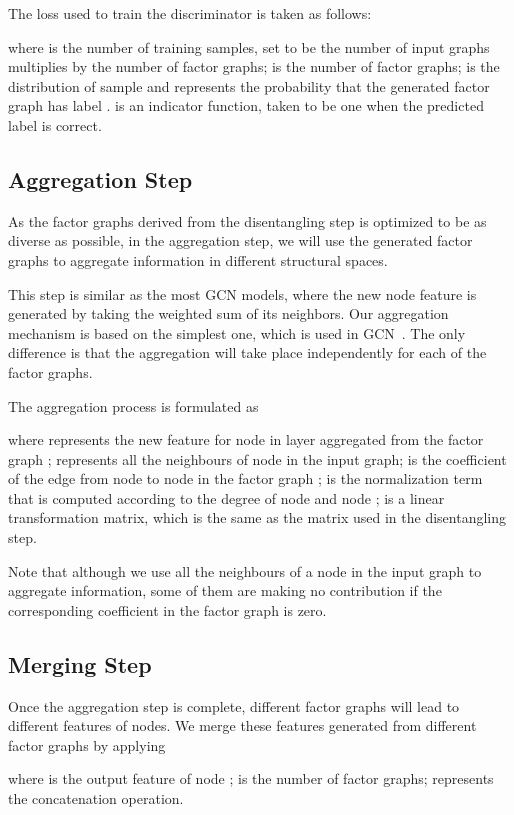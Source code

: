 \documentclass{article}
\begin{document}
The loss used to train the discriminator 
is taken as follows:
\begin{small}

\end{small}\noindent
where  is the number of training samples, 
set to be the number of input graphs 
multiplies by the number of factor graphs; 
 is the number of factor
graphs;  is the distribution
of sample  and  represents the
probability that the generated factor graph has label . 
 is an indicator function, taken to be one
when the predicted label is correct.

\subsection{{Aggregation Step}}
As the factor graphs derived from the disentangling step
is optimized to be as diverse as possible,
in the aggregation step, we will use the generated factor graphs
to aggregate information in different structural spaces.

This step is similar as the most GCN models, where
the new node feature is generated by taking the weighted sum of its
neighbors. Our aggregation mechanism is based on
the simplest one, which is used in GCN~\citep{kipf2017semi}. 
The only difference is that the aggregation will take place independently
for each of the factor graphs. 

The aggregation process is formulated as
\begin{small}

\end{small}\noindent
where  represents the new feature for node
 in  layer aggregated 
{from} the factor graph ;  represents all
the neighbours of node  in the input graph;
 is the coefficient of the edge from node  to
node  in the factor graph ;  is the
normalization term that is computed according to
the degree of node  and node ; 
 is a linear transformation matrix, 
which is the same as the matrix used in the disentangling step.

Note that although we use all the neighbours of a node
in the input graph to aggregate information, 
{some of them are making no contribution if the corresponding
coefficient in the factor graph is zero.}

\subsection{{Merging Step}}
Once the aggregation step is complete,
different factor graphs will lead to 
different features of nodes. 
We merge these  features generated from 
different factor graphs by applying
\begin{small}

\end{small}\noindent
where  is the output feature of node ; 
is the number of factor graphs;  represents the 
concatenation operation.
\end{document}

